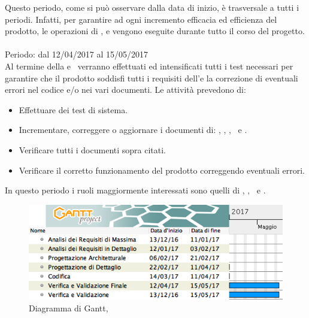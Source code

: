 Questo periodo, come si può osservare dalla data di inizio, è trasversale a tutti i periodi. Infatti, per garantire ad ogni incremento efficacia ed efficienza del prodotto, le operazioni di ,  e  vengono eseguite durante tutto il corso del progetto.\\

\paragraph{\VV}
Periodo: dal 12/04/2017 al 15/05/2017 \\

Al termine della \PD e \COD\ verranno effettuati ed intensificati tutti i test necessari per garantire che il prodotto soddisfi tutti i requisiti dell'\AdR e la correzione di eventuali errori nel codice e/o nei vari documenti.
Le attività prevedono di:
\begin{itemize}
	\item Effettuare dei test di sistema.
	\item Incrementare, correggere o aggiornare i documenti di: \MU, \NdP, \PdP, \PdQ\ e \Gl.
	\item Verificare tutti i documenti sopra citati.
	\item Verificare il corretto funzionamento del prodotto correggendo eventuali errori.
\end{itemize}
In questo periodo i ruoli maggiormente interessati sono quelli di \Ver, \Prog, \Am\ e \Pm.

 \begin{figure}[H]
	\centering 
	\includegraphics[scale=0.5]{Immagini/Gantt/VV.png}
	\caption{Diagramma di Gantt, \VV}
\end{figure}
